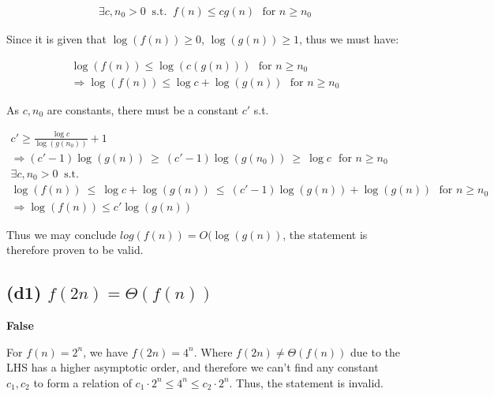 \documentclass[12pt]{article}
\begin{document}
\begin{gather}
    \exists c, n_{0} > 0 \ \text{ s.t. } \ f(n) \leq cg(n) \ \ \ \text{for $n \geq n_{0}$}
\end{gather}


Since it is given that $\log(f(n))\geq 0$, $\log(g(n)) \geq 1 $, thus we must have:

\begin{gather}
    \log(f(n)) \leq \log(c(g(n))) \ \ \ \text{for $n \geq n_{0}$} \nonumber\\
    \Rightarrow \log(f(n)) \leq \log c + \log(g(n)) \ \ \ \text{for $n \geq n_{0}$}
\end{gather}

As $c, n_{0}$ are constants, there must be a constant $c'$ s.t.


\begin{gather}
    c' \geq \frac{\log c}{\log (g(n_{0}))} + 1 \\
    \Rightarrow (c' -1)\log (g(n))  \ \geq \ (c' -1)\log (g(n_{0})) \ \geq \ \log c \ \ \ \text{for $n \geq n_{0}$} \\
    \exists c, n_{0} > 0 \nonumber \ \text{ s.t. } \  \\
    \log(f(n)) \ \leq \ \log c + \log(g(n)) \ \leq \  (c' -1)\log (g(n)) + \log(g(n))\ \ \ \text{for $n \geq n_{0}$} \\
    \Rightarrow \log(f(n))  \leq c'\log (g(n))
\end{gather}

Thus we may conclude $log(f(n)) = O(\log(g(n))$, the statement is therefore proven to be valid.


\subsection{(d1) $f(2n) = \Theta(f(n))$}

\textbf{False}

For $f(n) = 2^n$, we have $f(2n) = 4^n$. Where $f(2n) \neq \Theta(f(n))$ due to the LHS has a higher asymptotic order, and therefore we can't find any constant $c_{1}, c_{2}$ to form a relation of $c_1 \cdot 2^n \leq 4^n \leq c_2 \cdot 2^n$. Thus, the statement is invalid.


\end{document}

